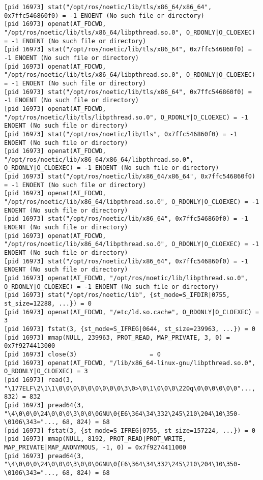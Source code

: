 \documentclass[a4paper, 12pt]{article}
\begin{document}
\begin{lstlisting}
[pid 16973] stat("/opt/ros/noetic/lib/tls/x86_64/x86_64", 0x7ffc546860f0) = -1 ENOENT (No such file or directory)
[pid 16973] openat(AT_FDCWD, "/opt/ros/noetic/lib/tls/x86_64/libpthread.so.0", O_RDONLY|O_CLOEXEC) = -1 ENOENT (No such file or directory)
[pid 16973] stat("/opt/ros/noetic/lib/tls/x86_64", 0x7ffc546860f0) = -1 ENOENT (No such file or directory)
[pid 16973] openat(AT_FDCWD, "/opt/ros/noetic/lib/tls/x86_64/libpthread.so.0", O_RDONLY|O_CLOEXEC) = -1 ENOENT (No such file or directory)
[pid 16973] stat("/opt/ros/noetic/lib/tls/x86_64", 0x7ffc546860f0) = -1 ENOENT (No such file or directory)
[pid 16973] openat(AT_FDCWD, "/opt/ros/noetic/lib/tls/libpthread.so.0", O_RDONLY|O_CLOEXEC) = -1 ENOENT (No such file or directory)
[pid 16973] stat("/opt/ros/noetic/lib/tls", 0x7ffc546860f0) = -1 ENOENT (No such file or directory)
[pid 16973] openat(AT_FDCWD, "/opt/ros/noetic/lib/x86_64/x86_64/libpthread.so.0", O_RDONLY|O_CLOEXEC) = -1 ENOENT (No such file or directory)
[pid 16973] stat("/opt/ros/noetic/lib/x86_64/x86_64", 0x7ffc546860f0) = -1 ENOENT (No such file or directory)
[pid 16973] openat(AT_FDCWD, "/opt/ros/noetic/lib/x86_64/libpthread.so.0", O_RDONLY|O_CLOEXEC) = -1 ENOENT (No such file or directory)
[pid 16973] stat("/opt/ros/noetic/lib/x86_64", 0x7ffc546860f0) = -1 ENOENT (No such file or directory)
[pid 16973] openat(AT_FDCWD, "/opt/ros/noetic/lib/x86_64/libpthread.so.0", O_RDONLY|O_CLOEXEC) = -1 ENOENT (No such file or directory)
[pid 16973] stat("/opt/ros/noetic/lib/x86_64", 0x7ffc546860f0) = -1 ENOENT (No such file or directory)
[pid 16973] openat(AT_FDCWD, "/opt/ros/noetic/lib/libpthread.so.0", O_RDONLY|O_CLOEXEC) = -1 ENOENT (No such file or directory)
[pid 16973] stat("/opt/ros/noetic/lib", {st_mode=S_IFDIR|0755, st_size=12288, ...}) = 0
[pid 16973] openat(AT_FDCWD, "/etc/ld.so.cache", O_RDONLY|O_CLOEXEC) = 3
[pid 16973] fstat(3, {st_mode=S_IFREG|0644, st_size=239963, ...}) = 0
[pid 16973] mmap(NULL, 239963, PROT_READ, MAP_PRIVATE, 3, 0) = 0x7f9274413000
[pid 16973] close(3)                    = 0
[pid 16973] openat(AT_FDCWD, "/lib/x86_64-linux-gnu/libpthread.so.0", O_RDONLY|O_CLOEXEC) = 3
[pid 16973] read(3, "\177ELF\2\1\1\0\0\0\0\0\0\0\0\0\3\0>\0\1\0\0\0\220q\0\0\0\0\0\0"..., 832) = 832
[pid 16973] pread64(3, "\4\0\0\0\24\0\0\0\3\0\0\0GNU\0{E6\364\34\332\245\210\204\10\350-\0106\343="..., 68, 824) = 68
[pid 16973] fstat(3, {st_mode=S_IFREG|0755, st_size=157224, ...}) = 0
[pid 16973] mmap(NULL, 8192, PROT_READ|PROT_WRITE, MAP_PRIVATE|MAP_ANONYMOUS, -1, 0) = 0x7f9274411000
[pid 16973] pread64(3, "\4\0\0\0\24\0\0\0\3\0\0\0GNU\0{E6\364\34\332\245\210\204\10\350-\0106\343="..., 68, 824) = 68

\end{lstlisting}
\end{document}
